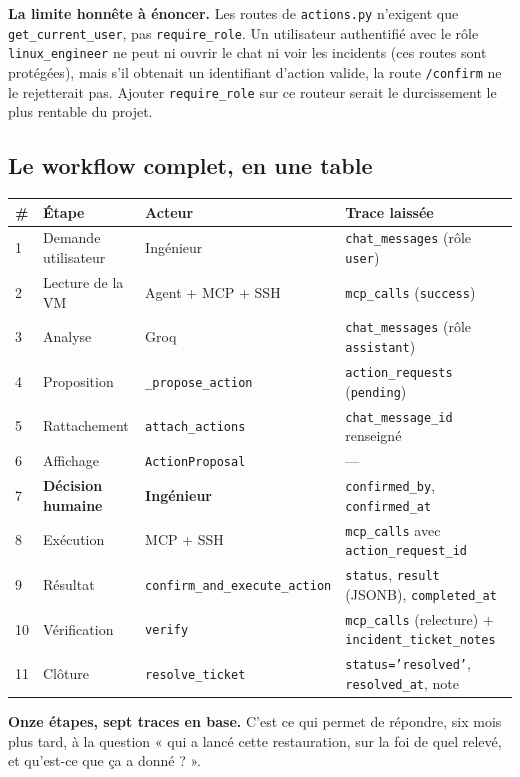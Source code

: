 \documentclass[11pt,a4paper]{report}
\newcommand{\file}[1]{\texttt{\small #1}}
\newcommand{\fn}[1]{\texttt{\small\textcolor{oasisviolet}{#1}}}
\newcommand{\cls}[1]{\texttt{\small\textcolor{oasisblue}{#1}}}
\newcommand{\tbl}[1]{\texttt{\small\textcolor{oasisamber}{#1}}}
\newcommand{\route}[1]{\texttt{\small\textcolor{oasisgreen}{#1}}}
\begin{document}
\begin{warnbox}
\textbf{La limite honnête à énoncer.} Les routes de \file{actions.py} n'exigent
que \fn{get\_current\_user}, pas \fn{require\_role}. Un utilisateur authentifié
avec le rôle \texttt{linux\_engineer} ne peut ni ouvrir le chat ni voir les
incidents (ces routes sont protégées), mais s'il obtenait un identifiant
d'action valide, la route \route{/confirm} ne le rejetterait pas. Ajouter
\fn{require\_role} sur ce routeur serait le durcissement le plus rentable du
projet.
\end{warnbox}

\subsection{Le workflow complet, en une table}

\begin{longtable}{@{}p{0.7cm}p{3.7cm}p{4.3cm}p{5.7cm}@{}}
\toprule
\textbf{\#} & \textbf{Étape} & \textbf{Acteur} & \textbf{Trace laissée}\\
\midrule
\endhead
1 & Demande utilisateur & Ingénieur & \tbl{chat\_messages} (rôle \texttt{user})\\
2 & Lecture de la VM & Agent + MCP + SSH & \tbl{mcp\_calls} (\texttt{success})\\
3 & Analyse & Groq & \tbl{chat\_messages} (rôle \texttt{assistant})\\
4 & Proposition & \fn{\_propose\_action} & \tbl{action\_requests} (\texttt{pending})\\
5 & Rattachement & \fn{attach\_actions} & \texttt{chat\_message\_id} renseigné\\
6 & Affichage & \cls{ActionProposal} & ---\\
7 & \textbf{Décision humaine} & \textbf{Ingénieur} & \texttt{confirmed\_by}, \texttt{confirmed\_at}\\
8 & Exécution & MCP + SSH & \tbl{mcp\_calls} avec \texttt{action\_request\_id}\\
9 & Résultat & \fn{confirm\_and\_execute\_action} & \texttt{status}, \texttt{result} (JSONB), \texttt{completed\_at}\\
10 & Vérification & \fn{verify} & \tbl{mcp\_calls} (relecture) + \tbl{incident\_ticket\_notes}\\
11 & Clôture & \fn{resolve\_ticket} & \texttt{status='resolved'}, \texttt{resolved\_at}, note\\
\bottomrule
\end{longtable}

\begin{keybox}
\textbf{Onze étapes, sept traces en base.} C'est ce qui permet de répondre, six
mois plus tard, à la question « qui a lancé cette restauration, sur la foi de
quel relevé, et qu'est-ce que ça a donné ? ».
\end{keybox}
\end{document}
